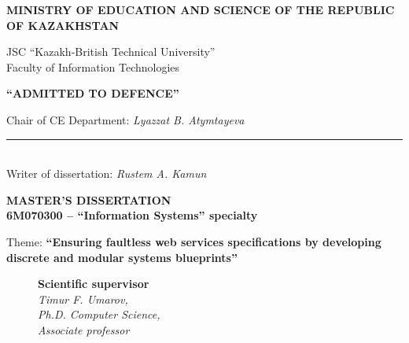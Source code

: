 \begin{titlepage}
    \pagestyle{empty}
    \begin{center}
        {\bf{\MakeUppercase{Ministry of education and science of the republic of Kazakhstan}}

        \vspace{14pt}

        JSC ``Kazakh-British Technical University''\\
        Faculty of Information Technologies}
       
       \vspace{14pt}
       
        \begin{flushright}
            {\bf \MakeUppercase{``Admitted to defence''}}

            Chair of CE Department: {\em Lyazzat B. Atymtayeva}\\
            \vspace{0.5\baselineskip}
            \rule{13em}{0.4pt}\\
            \vspace{14pt}
          Writer of dissertation: {\em Rustem A. Kamun}
          \vspace{14pt}
        \end{flushright}
        
        {\bf
        \MakeUppercase{Master's Dissertation}\\
        6M070300 -- ``Information Systems'' specialty}

        \vspace{14pt}

        Theme: {\bf ``Ensuring faultless web services specifications by developing discrete and modular systems blueprints''}
        
        \vspace{28pt}
        
        \begin{figure}[ht]
            \begin{minipage}[t]{0.6\linewidth}
                {\bf Scientific supervisor}\\

                {\em Timur F. Umarov,\\
                Ph.D. Computer Science,\\
                Associate professor}\\
            \end{minipage}
        \end{figure}


\end{center}
\end{titlepage}

